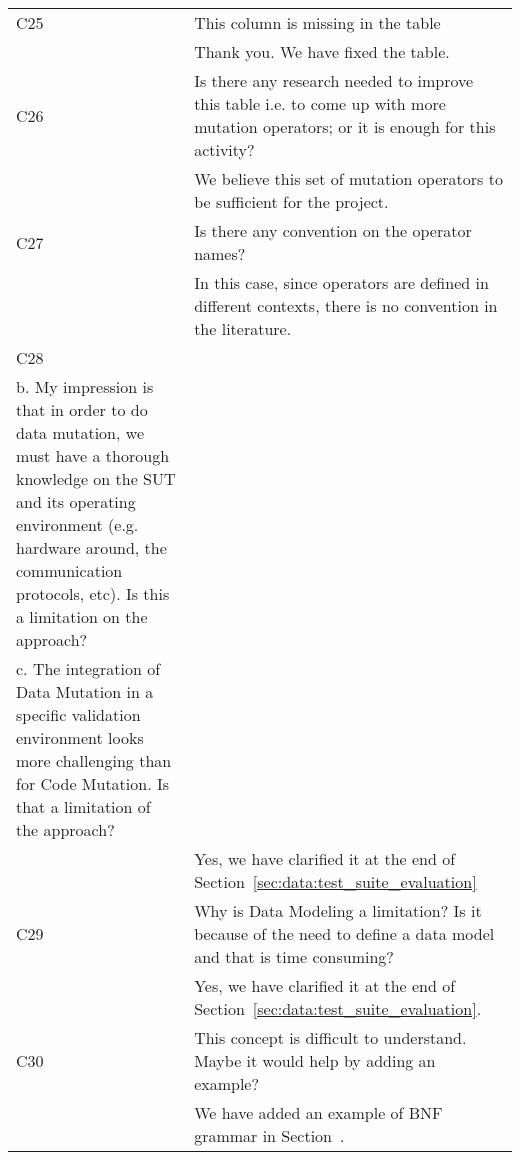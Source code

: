 \begin{longtable}{|p{1.2cm}|p{12cm}|@{}}
\hline
C25&
This column is missing in the table
\\
\cmidrule{2-2}
&Thank you. We have fixed the table.
\\

\hline
C26&
Is there any research needed to improve this table i.e. to come up with more mutation operators; or it is enough for this activity?
\\
&We believe this set of mutation operators to be sufficient for the project.
\\
\hline
C27&
Is there any convention on the operator names?
\\
\cmidrule{2-2}
&In this case, since operators are defined in different contexts, there is no convention in the literature.
\\

\hline
C28&
\begin{minipage}{10cm}
a. Is Run-Time Scalability a limitation in data mutation?\\
b. My impression is that in order to do data mutation, we must have a thorough knowledge on the SUT and its operating environment (e.g. hardware
around, the communication protocols, etc). Is this a limitation on the approach?\\
c. The integration of Data Mutation in a specific validation environment looks more challenging than for Code Mutation. Is that a limitation of the
approach?
\end{minipage}
\\
\cmidrule{2-2}
&Yes, we have clarified it at the end of Section~\ref{sec:data:test_suite_evaluation}
\\
\hline
C29&
Why is Data Modeling a limitation? Is it because of the need to define a data model and that is time consuming?
\\
\cmidrule{2-2}
&Yes, we have clarified it at the end of Section~\ref{sec:data:test_suite_evaluation}.
\\
\hline
C30&
This concept is difficult to understand. Maybe it would help by adding an example?
\\
\cmidrule{2-2}
&We have added an example of BNF grammar in Section~\cite{sec:dataModeling}.
\\


\bottomrule                                                             
\end{longtable}
\normalsize

\clearpage